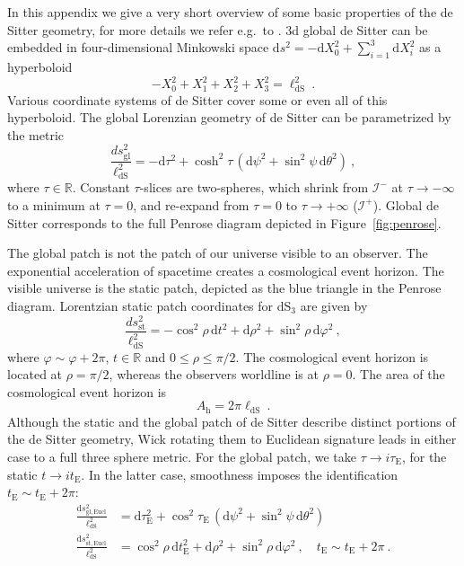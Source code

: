 \documentclass[12pt,a4paper]{article}
\renewcommand\d{\text{d}}
\renewcommand{\leq}{\leqslant}
\begin{document}
In this appendix we give a very short overview of some basic properties of the de Sitter geometry, for more details we refer e.g.\ to \cite{Anninos:2012qw}. 3d global de Sitter can be embedded in four-dimensional Minkowski space $\d s^2 = -\d X_0^2 + \sum_{i=1}^3 \d X_i^2$ as a hyperboloid
\begin{equation}
    -X_0^2 +X_1^2 +X_2^2 + X_3^2 = \ell_{\mathrm{dS}}^2~.
\end{equation}
Various coordinate systems of de Sitter cover some or even all of this hyperboloid. The global Lorenzian geometry of de Sitter can be parametrized by the metric 
\begin{equation}
    \frac{ds_{\mathrm{gl}}^2}{\ell_{\mathrm{dS}}^2} = -\d\tau^2 +  \cosh^2 \tau\, (\d\psi^2 + \sin^2 \psi \, \d\theta^2)~,
\end{equation}
where $\tau \in \mathbb{R}$. Constant $\tau$-slices are two-spheres, which shrink from $\mathcal{I}^-$ at $\tau\rightarrow -\infty$ to a minimum at $\tau=0$, and re-expand from $\tau=0$ to $\tau\rightarrow +\infty$ ($\mathcal{I}^+$). Global de Sitter corresponds to the full Penrose diagram depicted in Figure~\ref{fig:penrose}.


The global patch is not the patch of our universe visible to an observer. The exponential acceleration of spacetime creates a cosmological event horizon. The visible universe is the static patch, depicted as the blue triangle in the Penrose diagram. Lorentzian static patch coordinates for dS$_3$ are given by
\begin{equation}
    \frac{ds_{\mathrm{st}}^2}{\ell_{\mathrm{dS}}^2} = -\cos^2\rho\, \d t^2 + \d\rho^2 + \sin^2\rho \, \d\varphi^2~,
\end{equation}
where $\varphi \sim \varphi +2\pi$, $t\in \mathbb{R}$ and $0\leq \rho\leq \pi/2$. The cosmological event horizon is located at $\rho =\pi/2$, whereas the observers worldline is at $\rho=0$. The area of the cosmological event horizon is 
\begin{equation}\label{eq: horizon area}
    A_{\text{h}} = 2\pi \ell_{\mathrm{dS}}~.
\end{equation}
Although the static and the global patch of de Sitter describe distinct portions of the de Sitter geometry, Wick rotating them to Euclidean signature leads in either case to a full three sphere metric. For the global patch, we take $\tau \rightarrow i \tau_{\text{E}}$, for the static $t\rightarrow i t_{\text{E}}$. In the latter case, smoothness imposes the identification $t_{\text{E}} \sim t_{\text{E}} + 2\pi$: 
\begin{subequations}
\begin{align}
 \frac{\d s_{\mathrm{gl, Eucl}}^2}{\ell_{\mathrm{dS}}^2} &= \d\tau_{\text{E}}^2 +  \cos^2 \tau_{\text{E}}\, (\d\psi^2 + \sin^2 \psi \, \d\theta^2)\\
    \frac{\d s_{\mathrm{st, Eucl}}^2}{\ell_{\mathrm{dS}}^2} &= \cos^2\rho\, \d t_{\text{E}}^2 + \d\rho^2 + \sin^2\rho \, \d\varphi^2~,\quad t_{\text{E}} \sim t_{\text{E}}+ 2\pi~.
\end{align}
\end{subequations}
\end{document}
